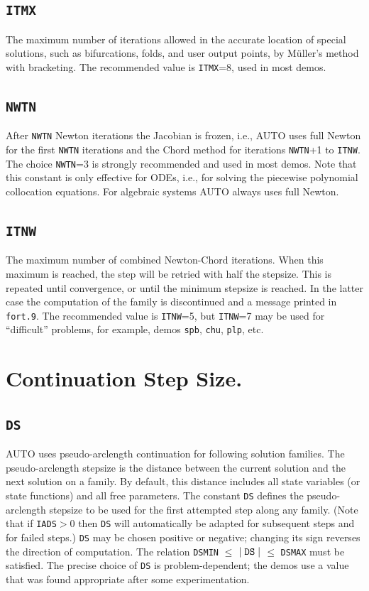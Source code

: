 \documentclass[12pt]{report}
\def\abs#1{\mid#1\mid}
\begin{document}
\subsection{\tt ITMX}  \label{sec:ITMX}
 The maximum number of iterations allowed in the accurate
 location of special solutions, such as bifurcations, folds, 
 and user output points, by M\"uller's method with bracketing.
 The recommended value is {\tt ITMX}=8, used in most demos.

\subsection{\tt NWTN}  \label{sec:NWTN}
 After {\tt NWTN} Newton iterations the Jacobian is frozen, i.e.,
 {\cal AUTO} uses full Newton for the first {\tt NWTN} iterations
 and the Chord method for iterations {\tt NWTN}+1 to {\tt ITNW}.
 The choice {\tt NWTN}=3 is strongly recommended and used in most demos.
 Note that this constant is only effective for ODEs, i.e., for solving
 the piecewise polynomial collocation equations.
 For algebraic systems {\cal AUTO} always uses full Newton.

\subsection{\tt ITNW}  \label{sec:ITNW}
 The maximum number of combined Newton-Chord iterations.
 When this maximum is reached, the step will be retried with 
 half the stepsize.
 This is repeated until convergence, or until the minimum
 stepsize is reached. In the latter case the computation of
 the family is discontinued and a message printed in {\tt fort.9}.
 The recommended value is {\tt ITNW}=5, but {\tt ITNW}=7 may be used for 
 ``difficult'' problems, for example, 
 demos {\tt spb}, {\tt chu}, {\tt plp}, etc.

\section{ Continuation Step Size.} \label{sec:step_size}
\subsection{\tt DS}  \label{sec:DS}
 {\cal AUTO} uses pseudo-arclength continuation for following solution families.
 The pseudo-arclength stepsize is the distance between
 the current solution and the next solution on a family.
 By default, this distance includes all state variables
 (or state functions) and all free parameters.
 The constant {\tt DS} defines the pseudo-arclength stepsize to be used for the
 first attempted step along any family. 
 (Note that if {\tt IADS}$>$0 then {\tt DS} will automatically be adapted
 for subsequent steps and for failed steps.)
 {\tt DS} may be chosen positive or negative; changing its sign 
 reverses the direction of computation.
 The relation {\tt DSMIN} $\le$ $\abs {\tt DS}$ $\le$ {\tt DSMAX} must be satisfied.
 The precise choice of {\tt DS} is problem-dependent; the demos use a value 
 that was found appropriate after some experimentation.
 
\end{document}
